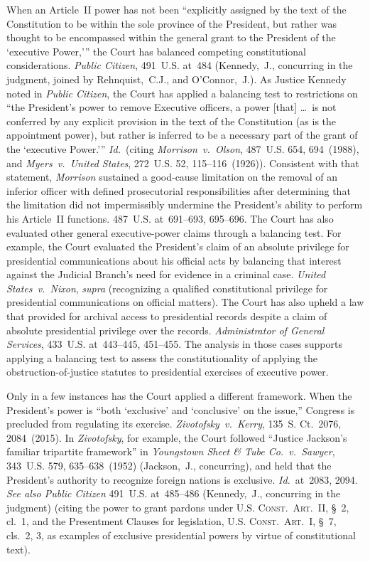 When an Article~II power has not been ``explicitly assigned by the text of the Constitution to be within the sole province of the President, but rather was thought to be encompassed within the general grant to the President of the `executive Power,'\thinspace'' the Court has balanced competing constitutional considerations.
\textit{Public Citizen}, 491~U.S. at~484 (Kennedy,~J., concurring in the judgment, joined by Rehnquist,~C.J., and O'Connor,~J.).
As Justice Kennedy noted in \textit{Public Citizen}, the Court has applied a balancing test to restrictions on ``the President's power to remove Executive officers, a power [that] \dots\ is not conferred by any explicit provision in the text of the Constitution (as is the appointment power), but rather is inferred to be a necessary part of the grant of the `executive Power.'\thinspace''
\textit{Id.}~(citing \textit{Morrison~v.\ Olson}, 487~U.S. 654, 694~(1988), and \textit{Myers~v.\ United States}, 272~U.S. 52, 115--116~(1926)).
Consistent with that statement, \textit{Morrison} sustained a good-cause limitation on the removal of an inferior officer with defined prosecutorial responsibilities after determining that the limitation did not impermissibly undermine the President's ability to perform his Article~II functions.
487~U.S. at~691--693, 695--696.
The Court has also evaluated other general executive-power claims through a balancing test.
For example, the Court evaluated the President's claim of an absolute privilege for presidential communications about his official acts by balancing that interest against the Judicial Branch's need for evidence in a criminal case.
\textit{United States~v.\ Nixon}, \textit{supra} (recognizing a qualified constitutional privilege for presidential communications on official matters).
The Court has also upheld a law that provided for archival access to presidential records despite a claim of absolute presidential privilege over the records.
\textit{Administrator of General Services}, 433~U.S. at~443--445, 451--455.
The analysis in those cases supports applying a balancing test to assess the constitutionality of applying the obstruction-of-justice statutes to presidential exercises of executive power.

Only in a few instances has the Court applied a different framework.
When the President's power is ``both `exclusive' and `conclusive' on the issue,'' Congress is precluded from regulating its exercise.
\textit{Zivotofsky~v.\ Kerry}, 135~S. Ct.~2076, 2084~(2015).
In \textit{Zivotofsky}, for example, the Court followed ``Justice Jackson's familiar tripartite framework'' in \textit{Youngstown Sheet \& Tube Co.~v.\ Sawyer}, 343~U.S. 579, 635--638~(1952) (Jackson,~J., concurring), and held that the President's authority to recognize foreign nations is exclusive.
\textit{Id.}~at~2083, 2094.
\textit{See also Public Citizen} 491~U.S. at~485--486 (Kennedy,~J., concurring in the judgment) (citing the power to grant pardons under \textsc{U.S. Const.\ Art.~II}, \S~2, cl.~1, and the Presentment Clauses for legislation, \textsc{U.S. Const.\ Art.~I}, \S~7, cls.~2, 3, as examples of exclusive presidential powers by virtue of constitutional text).

